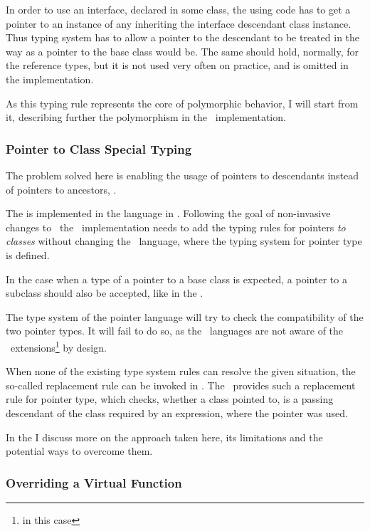In order to use an interface, declared in some class, the using code has to get a pointer to an instance
of any inheriting the interface descendant class instance. Thus typing system has to allow a pointer
to the descendant to be treated in the way as a pointer to the base class would be. The same should hold, 
normally, for the reference types, but it is not used very often on practice, and is omitted in the implementation.

As this typing rule represents the core of polymorphic behavior, I will start from it, describing further the
polymorphism in the \pcpp\ implementation.

\subsubsection{Pointer to Class Special Typing}

The problem solved here is enabling the usage of pointers to descendants instead of pointers to ancestors,
.


The   is implemented in the  language in \mbdr. 
Following the goal of non-invasive changes to \mbeddr\ the \pcpp\ implementation needs to add the 
typing rules for pointers \emph{to classes} without changing the    \mbdr\ language, where the 
typing system for pointer type is defined.

In the case when a type of a pointer to a base class is expected, a pointer to a subclass should also be accepted, like
in the .

The type system of the pointer language will try to check the compatibility of the two pointer types. It will
fail to do so, as the \mbdr\ languages are not aware of the \pcpp\ extensions\footnote{  in this case} 
by design.

When none of the existing type system rules can resolve the given situation, the so-called replacement
rule can be invoked in \jbmps. The \pcpp\ provides such a replacement rule for pointer type, which checks, whether a
class pointed to, is a passing descendant of the class required by an expression, where the pointer was
used.

In the  I discuss more on the approach taken here, its limitations and 
the potential ways to overcome them.

\subsubsection{Overriding a Virtual Function}
\label{overridefunction}

